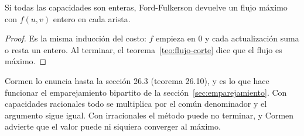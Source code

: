 \documentclass[11pt,letterpaper]{article}
\begin{document}
\begin{corolario}[Integralidad]\label{cor:flujo-integralidad}
  Si todas las capacidades son enteras, Ford-Fulkerson devuelve un
  flujo máximo con $f(u, v)$ entero en cada arista.
\end{corolario}

\begin{proof}
  Es la misma inducción del costo: $f$ empieza en $0$ y cada
  actualización suma o resta un entero. Al terminar, el
  teorema~\ref{teo:flujo-corte} dice que el flujo es máximo.
\end{proof}

Cormen lo enuncia hasta la sección 26.3 (teorema 26.10), y es lo que
hace funcionar el emparejamiento bipartito de la
sección~\ref{sec:emparejamiento}. Con capacidades racionales todo se
multiplica por el común denominador y el argumento sigue igual. Con
irracionales el método puede no terminar, y Cormen advierte que el
valor puede ni siquiera converger al máximo.
\end{document}
